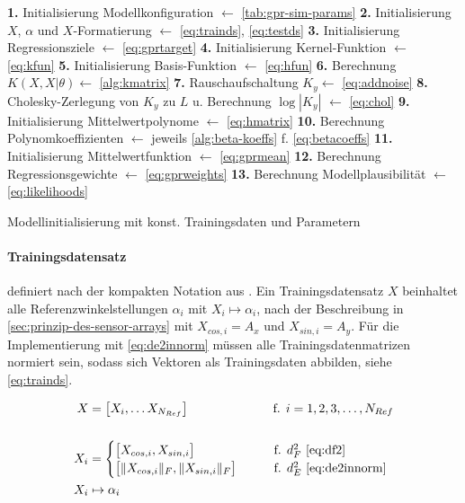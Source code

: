 \begin{algorithm}[bhp]
	\SetAlgoLined
	\textbf{1.} Initialisierung Modellkonfiguration $\leftarrow$ \autoref{tab:gpr-sim-params}\;
	\textbf{2.} Initialisierung $X$, $\alpha$ und $X$-Formatierung $\leftarrow$ \autoref{eq:trainds}, \autoref{eq:testds}\;
	\textbf{3.} Initialisierung Regressionsziele $\leftarrow$ \autoref{eq:gprtarget}\;
	\textbf{4.} Initialisierung Kernel-Funktion $\leftarrow$ \autoref{eq:kfun}\;
	\textbf{5.} Initialisierung Basis-Funktion $\leftarrow$ \autoref{eq:hfun}\;
	\textbf{6.} Berechnung $K(X,X|\theta) \leftarrow$ \autoref{alg:kmatrix}\;
	\textbf{7.} Rauschaufschaltung $K_y \leftarrow$ \autoref{eq:addnoise}\;
	\textbf{8.} Cholesky-Zerlegung von $K_y$ zu $L$ u. Berechnung $\log |K_y|$ $\leftarrow$ \autoref{eq:chol}\;
	\textbf{9.} Initialisierung Mittelwertpolynome $\leftarrow$ \autoref{eq:hmatrix}\;
	\textbf{10.} Berechnung Polynomkoeffizienten $\leftarrow$ jeweils \autoref{alg:beta-koeffs} f. \autoref{eq:betacoeffs}\;
	\textbf{11.} Initialisierung Mittelwertfunktion $\leftarrow$ \autoref{eq:gprmean}\;
	\textbf{12.} Berechnung Regressionsgewichte $\leftarrow$ \autoref{eq:gprweights}\;
	\textbf{13.} Berechnung Modellplausibilität $\leftarrow$ \autoref{eq:likelihoods}\;
	\caption{Modellinitialisierung mit konst. Trainingsdaten und Parametern}
	\label{alg:gprinit}
\end{algorithm}


\clearpage


\paragraph*{Trainingsdatensatz} definiert nach der kompakten Notation aus \cite{Rasmussen2006}. Ein Trainingsdatensatz $X$ beinhaltet alle Referenzwinkelstellungen $\alpha_i$ mit $X_i \mapsto \alpha_i$, nach der Beschreibung in \autoref{sec:prinzip-des-sensor-arrays} mit $X_{cos,i} = A_x$ und $X_{sin,i} = A_y$. Für die Implementierung mit \autoref{eq:de2innorm} müssen alle Trainingsdatenmatrizen normiert sein, sodass sich Vektoren als Trainingsdaten abbilden, siehe \autoref{eq:trainds}.


\begin{align}\label{eq:trainds}
	X   &= \big[ X_i, \ldots X_{N_{Ref}} \big] \qquad\qquad\qquad\quad\!  \text{f. } i = 1,2,3,\ldots,N_{Ref} \nonumber \\
	\\
	X_i &= 
		\begin{cases}
			\big[ X_{cos,i}, X_{sin,i} \big]             &\qquad \text{f. } d_F^2 \text{ \eqref{eq:df2}} \\
			\big[ \|X_{cos,i}\|_F, \|X_{sin,i}\|_F \big] &\qquad \text{f. } d_E^2 \text{ \eqref{eq:de2innorm}}
		\end{cases} \nonumber \\
	X_i & \mapsto \alpha_i \nonumber
\end{align}


